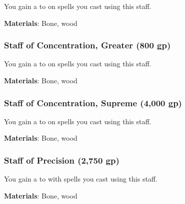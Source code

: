 You gain a   to  on spells you cast using this staff.



\vspace{0.25em}
\textbf{Materials}: Bone, wood


\lowercase{\hypertarget{item:Staff of Concentration, Greater}{}}\label{item:Staff of Concentration, Greater}
\hypertarget{item:Staff of Concentration, Greater}{\subsubsection{Staff of Concentration, Greater\hfill{} (800 gp)}}

You gain a   to  on spells you cast using this staff.



\vspace{0.25em}
\textbf{Materials}: Bone, wood


\lowercase{\hypertarget{item:Staff of Concentration, Supreme}{}}\label{item:Staff of Concentration, Supreme}
\hypertarget{item:Staff of Concentration, Supreme}{\subsubsection{Staff of Concentration, Supreme\hfill{} (4,000 gp)}}

You gain a   to  on spells you cast using this staff.



\vspace{0.25em}
\textbf{Materials}: Bone, wood


\lowercase{\hypertarget{item:Staff of Precision}{}}\label{item:Staff of Precision}
\hypertarget{item:Staff of Precision}{\subsubsection{Staff of Precision\hfill{} (2,750 gp)}}

You gain a   to  with spells you cast using this staff.



\vspace{0.25em}
\textbf{Materials}: Bone, wood


